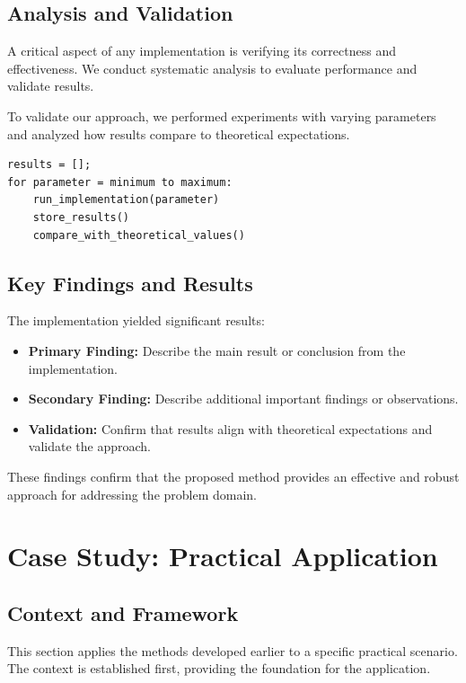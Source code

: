\subsection{Analysis and Validation}

A critical aspect of any implementation is verifying its correctness and effectiveness. We conduct systematic analysis to evaluate performance and validate results.

To validate our approach, we performed experiments with varying parameters and analyzed how results compare to theoretical expectations.

\begin{lstlisting}[caption={Validation Study}, label={lst:conv}]
results = [];
for parameter = minimum to maximum:
    run_implementation(parameter)
    store_results()
    compare_with_theoretical_values()
\end{lstlisting}

\subsection{Key Findings and Results}

The implementation yielded significant results:

\begin{itemize}
    \item \textbf{Primary Finding:} Describe the main result or conclusion from the implementation.
    \item \textbf{Secondary Finding:} Describe additional important findings or observations.
    \item \textbf{Validation:} Confirm that results align with theoretical expectations and validate the approach.
\end{itemize}

These findings confirm that the proposed method provides an effective and robust approach for addressing the problem domain.

\section{Case Study: Practical Application}

\subsection{Context and Framework}
This section applies the methods developed earlier to a specific practical scenario. The context is established first, providing the foundation for the application.

